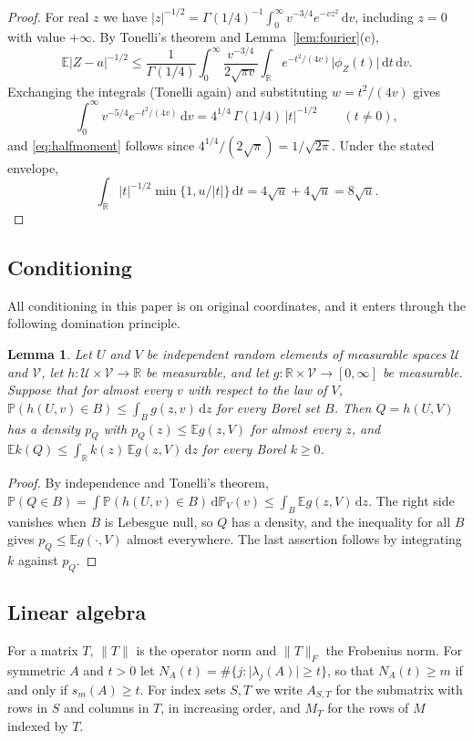 \documentclass[11pt]{amsart}
\numberwithin{equation}{section}
\newtheorem{lemma}[theorem]{Lemma}
\theoremstyle{definition}
\theoremstyle{remark}
\newcommand{\R}{\mathbb R}
\newcommand{\E}{\mathbb E}
\newcommand{\PP}{\mathbb P}
\newcommand{\1}{\mathbf 1}
\newcommand{\dd}{\,\mathrm d}
\newcommand{\norm}[1]{\lVert #1\rVert}
\newcommand{\abs}[1]{\lvert #1\rvert}
\begin{document}
\begin{proof}
For real $z$ we have $\abs z^{-1/2}=\Gamma(1/4)^{-1}\int_0^\infty v^{-3/4}e^{-vz^2}\dd v$, including $z=0$ with value $+\infty$. By Tonelli's theorem and Lemma~\ref{lem:fourier}(c),
\[
\E\abs{Z-a}^{-1/2}\le\frac{1}{\Gamma(1/4)}\int_0^\infty\frac{v^{-3/4}}{2\sqrt{\pi v}}\int_\R e^{-t^2/(4v)}\abs{\phi_Z(t)}\dd t\dd v .
\]
Exchanging the integrals (Tonelli again) and substituting $w=t^2/(4v)$ gives
\[
\int_0^\infty v^{-5/4}e^{-t^2/(4v)}\dd v=4^{1/4}\,\Gamma(1/4)\,\abs t^{-1/2}\qquad(t\ne0),
\]
and \eqref{eq:halfmoment} follows since $4^{1/4}/(2\sqrt\pi)=1/\sqrt{2\pi}$. Under the stated envelope,
\[
\int_\R\abs t^{-1/2}\min\{1,u/\abs t\}\dd t=4\sqrt u+4\sqrt u=8\sqrt u .
\]
\end{proof}

\subsection{Conditioning}
All conditioning in this paper is on original coordinates, and it enters through the following domination principle.

\begin{lemma}\label{lem:condition}
Let $U$ and $V$ be independent random elements of measurable spaces $\mathcal U$ and $\mathcal V$, let $h:\mathcal U\times\mathcal V\to\R$ be measurable, and let $g:\R\times\mathcal V\to[0,\infty]$ be measurable. Suppose that for almost every $v$ with respect to the law of $V$, $\PP(h(U,v)\in B)\le\int_Bg(z,v)\dd z$ for every Borel set $B$. Then $Q=h(U,V)$ has a density $p_Q$ with $p_Q(z)\le\E g(z,V)$ for almost every $z$, and $\E k(Q)\le\int_\R k(z)\,\E g(z,V)\dd z$ for every Borel $k\ge0$.
\end{lemma}

\begin{proof}
By independence and Tonelli's theorem, $\PP(Q\in B)=\int\PP(h(U,v)\in B)\dd\PP_V(v)\le\int_B\E g(z,V)\dd z$. The right side vanishes when $B$ is Lebesgue null, so $Q$ has a density, and the inequality for all $B$ gives $p_Q\le\E g(\cdot,V)$ almost everywhere. The last assertion follows by integrating $k$ against $p_Q$.
\end{proof}

\subsection{Linear algebra}
For a matrix $T$, $\norm T$ is the operator norm and $\norm T_F$ the Frobenius norm. For symmetric $A$ and $t>0$ let $N_A(t)=\#\{j:\abs{\lambda_j(A)}\ge t\}$, so that $N_A(t)\ge m$ if and only if $s_m(A)\ge t$. For index sets $S,T$ we write $A_{S,T}$ for the submatrix with rows in $S$ and columns in $T$, in increasing order, and $M_T$ for the rows of $M$ indexed by $T$.
\end{document}
